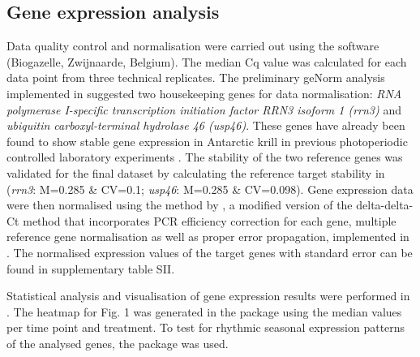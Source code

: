 \subsection{Gene expression analysis}

Data quality control and normalisation were carried out using the software
 (Biogazelle, Zwijnaarde, Belgium). The median Cq value was
calculated for each data point from three technical replicates. The preliminary
geNorm analysis \citep{vandesompele_accurate_2002} implemented in 
suggested two housekeeping genes for data normalisation: \textit{RNA polymerase
I-specific transcription initiation factor RRN3 isoform 1 (rrn3)} and
\textit{ubiquitin carboxyl-terminal hydrolase 46 (usp46)}. These genes have
already been found to show stable gene expression in Antarctic krill in
previous photoperiodic controlled laboratory experiments \citep[; Bisconton et
al., in prep.]{piccolin_seasonal_2018}. The stability of the two reference
genes was validated for the final dataset by calculating the reference target
stability in  (\textit{rrn3}: M=0.285 \& CV=0.1; \textit{usp46}:
M=0.285 \& CV=0.098). Gene expression data were then normalised using the
method by \citet{hellemans_qbase_2007}, a modified version of the
delta-delta-Ct method that incorporates PCR efficiency correction for each
gene, multiple reference gene normalisation as well as proper error
propagation, implemented in . The normalised expression values of
the target genes with standard error can be found in supplementary table SII.


Statistical analysis and visualisation of gene expression results were
performed in  \citep{rstudio_team_rstudio:_2016}.
The heatmap for Fig. 1 was generated in the  package 
\citep{warnes_gplots:_2016} using the median values per time point and
treatment. To test for rhythmic seasonal expression patterns of the analysed
genes, the  package  \citep{thaben_detecting_2014} was used.

